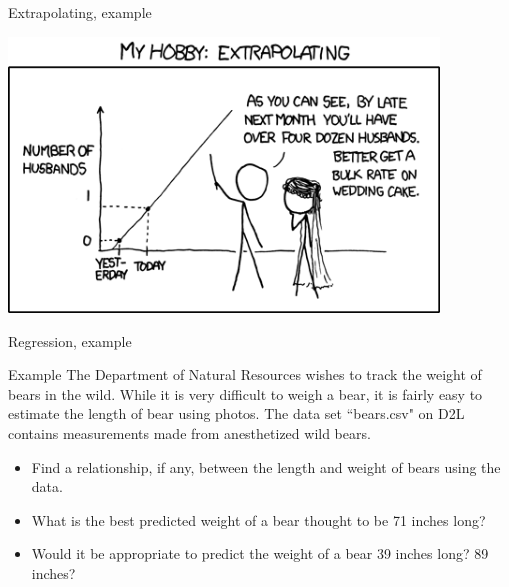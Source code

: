 \documentclass[xcolor=table, aspectratio=169, bigger, handout]{beamer}
\begin{document}
\begin{frame}{Extrapolating, example}

{\centering
\includegraphics[width=4.5in]{../images/ch10_extrapolating}
\par}
\end{frame}



\begin{frame}{Regression, example}
\begin{exampleblock}{Example}
The Department of Natural Resources wishes to track the weight of bears in the wild. While it is very difficult to weigh a bear, it is fairly easy to estimate the length of bear using photos. The data set ``bears.csv" on D2L contains measurements made from anesthetized wild bears.\\
\begin{itemize}
\item Find a relationship, if any, between the length and weight of bears using the data.
\item What is the best predicted weight of a bear thought to be 71 inches long?
\item Would it be appropriate to predict the weight of a bear 39 inches long? 89 inches?
\end{itemize}
\end{exampleblock}
\end{frame}
\end{document}
